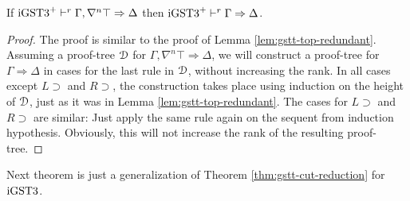 \documentclass[10pt,a4paper]{amsart}
\begin{document}
\begin{lem}\label{lem:isttp-top-redundant} If $\text{iGST3}^+ \vdash^r \Gamma , \nabla^n \top \Rightarrow \Delta$ then $\text{iGST3}^+ \vdash^r \Gamma \Rightarrow \Delta$.
\end{lem}
\begin{proof}
  The proof is similar to the proof of Lemma \ref{lem:gstt-top-redundant}. Assuming a proof-tree $\mathcal{D}$ for $\Gamma, \nabla^n \top \Rightarrow \Delta$, we will construct a proof-tree for $\Gamma \Rightarrow \Delta$ in cases for the last rule in $\mathcal{D}$, without increasing the rank. In all cases except $L \supset$ and $R \supset$, the construction takes place using induction on the height of $\mathcal{D}$, just as it was in Lemma \ref{lem:gstt-top-redundant}. The cases for $L \supset$ and $R \supset$ are similar: Just apply the same rule again on the sequent from induction hypothesis. Obviously, this will not increase the rank of the resulting proof-tree.
\end{proof}

Next theorem is just a generalization of Theorem \ref{thm:gstt-cut-reduction} for $\text{iGST3}$.
\end{document}
